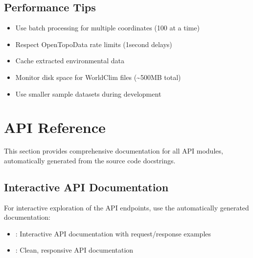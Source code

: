 \documentclass[letterpaper,10pt,english]{sphinxmanual}
\begin{document}
\section{Performance Tips}
\label{\detokenize{user_guide:performance-tips}}\begin{itemize}
\item {} 
\sphinxAtStartPar
Use batch processing for multiple coordinates (100 at a time)

\item {} 
\sphinxAtStartPar
Respect Open\sphinxhyphen{}Topo\sphinxhyphen{}Data rate limits (1\sphinxhyphen{}second delays)

\item {} 
\sphinxAtStartPar
Cache extracted environmental data

\item {} 
\sphinxAtStartPar
Monitor disk space for WorldClim files (\textasciitilde{}500MB total)

\item {} 
\sphinxAtStartPar
Use smaller sample datasets during development

\end{itemize}

\sphinxstepscope


\chapter{API Reference}
\label{\detokenize{api_reference:api-reference}}\label{\detokenize{api_reference::doc}}
\sphinxAtStartPar
This section provides comprehensive documentation for all API modules, automatically generated from the source code docstrings.


\section{Interactive API Documentation}
\label{\detokenize{api_reference:interactive-api-documentation}}
\sphinxAtStartPar
For interactive exploration of the API endpoints, use the automatically generated documentation:
\begin{itemize}
\item {} 
\sphinxAtStartPar
{}:  \sphinxhyphen{} Interactive API documentation with request/response examples

\item {} 
\sphinxAtStartPar
{}:  \sphinxhyphen{} Clean, responsive API documentation

\end{itemize}
\end{document}
